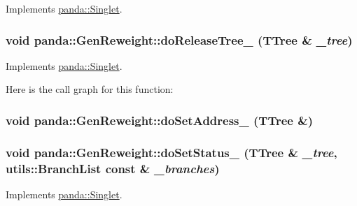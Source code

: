 Implements \hyperlink{classpanda_1_1Singlet_af5afe7bf7b223c51d1763953ac24d261}{panda::Singlet}.\hypertarget{classpanda_1_1GenReweight_ae503dff0c490313c523e8357e5916ed6}{
\subsubsection[{doReleaseTree\_\-}]{\setlength{\rightskip}{0pt plus 5cm}void panda::GenReweight::doReleaseTree\_\- (TTree \& {\em \_\-tree})}}
\label{classpanda_1_1GenReweight_ae503dff0c490313c523e8357e5916ed6}


Implements \hyperlink{classpanda_1_1Singlet_ad5acaa19bf3a8c360cf2e36604ab4530}{panda::Singlet}.

Here is the call graph for this function:\hypertarget{classpanda_1_1GenReweight_a9710ec6dfdb67b5e7d1f4ae811154b16}{
\subsubsection[{doSetAddress\_\-}]{\setlength{\rightskip}{0pt plus 5cm}void panda::GenReweight::doSetAddress\_\- (TTree \&)}}
\label{classpanda_1_1GenReweight_a9710ec6dfdb67b5e7d1f4ae811154b16}
\hypertarget{classpanda_1_1GenReweight_ac8e96798e059c6ddcbec6e0f91ab8190}{
\subsubsection[{doSetStatus\_\-}]{\setlength{\rightskip}{0pt plus 5cm}void panda::GenReweight::doSetStatus\_\- (TTree \& {\em \_\-tree}, \/  {\bf utils::BranchList} const \& {\em \_\-branches})}}
\label{classpanda_1_1GenReweight_ac8e96798e059c6ddcbec6e0f91ab8190}


Implements \hyperlink{classpanda_1_1Singlet_a660799e379f7949f3b8e2d74f6e1ddb2}{panda::Singlet}.

